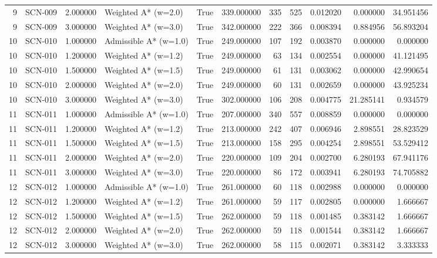 \begin{table}[htbp]
\begin{tabular}{rlrlrrrrrrr}
9 & SCN-009 & 2.000000 & Weighted A* (w=2.0) & True & 339.000000 & 335 & 525 & 0.012020 & 0.000000 & 34.951456 \\
9 & SCN-009 & 3.000000 & Weighted A* (w=3.0) & True & 342.000000 & 222 & 366 & 0.008394 & 0.884956 & 56.893204 \\
10 & SCN-010 & 1.000000 & Admissible A* (w=1.0) & True & 249.000000 & 107 & 192 & 0.003870 & 0.000000 & 0.000000 \\
10 & SCN-010 & 1.200000 & Weighted A* (w=1.2) & True & 249.000000 & 63 & 134 & 0.002554 & 0.000000 & 41.121495 \\
10 & SCN-010 & 1.500000 & Weighted A* (w=1.5) & True & 249.000000 & 61 & 131 & 0.003062 & 0.000000 & 42.990654 \\
10 & SCN-010 & 2.000000 & Weighted A* (w=2.0) & True & 249.000000 & 60 & 131 & 0.002659 & 0.000000 & 43.925234 \\
10 & SCN-010 & 3.000000 & Weighted A* (w=3.0) & True & 302.000000 & 106 & 208 & 0.004775 & 21.285141 & 0.934579 \\
11 & SCN-011 & 1.000000 & Admissible A* (w=1.0) & True & 207.000000 & 340 & 557 & 0.008859 & 0.000000 & 0.000000 \\
11 & SCN-011 & 1.200000 & Weighted A* (w=1.2) & True & 213.000000 & 242 & 407 & 0.006946 & 2.898551 & 28.823529 \\
11 & SCN-011 & 1.500000 & Weighted A* (w=1.5) & True & 213.000000 & 158 & 295 & 0.004254 & 2.898551 & 53.529412 \\
11 & SCN-011 & 2.000000 & Weighted A* (w=2.0) & True & 220.000000 & 109 & 204 & 0.002700 & 6.280193 & 67.941176 \\
11 & SCN-011 & 3.000000 & Weighted A* (w=3.0) & True & 220.000000 & 86 & 172 & 0.003941 & 6.280193 & 74.705882 \\
12 & SCN-012 & 1.000000 & Admissible A* (w=1.0) & True & 261.000000 & 60 & 118 & 0.002988 & 0.000000 & 0.000000 \\
12 & SCN-012 & 1.200000 & Weighted A* (w=1.2) & True & 261.000000 & 59 & 117 & 0.002805 & 0.000000 & 1.666667 \\
12 & SCN-012 & 1.500000 & Weighted A* (w=1.5) & True & 262.000000 & 59 & 118 & 0.001485 & 0.383142 & 1.666667 \\
12 & SCN-012 & 2.000000 & Weighted A* (w=2.0) & True & 262.000000 & 59 & 118 & 0.001544 & 0.383142 & 1.666667 \\
12 & SCN-012 & 3.000000 & Weighted A* (w=3.0) & True & 262.000000 & 58 & 115 & 0.002071 & 0.383142 & 3.333333 \\

\end{tabular}
\end{table}
